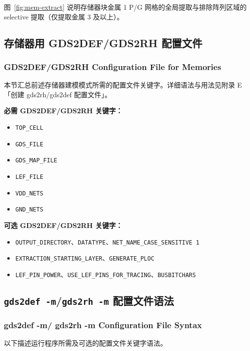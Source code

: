 \begin{itemize}
  图~\ref{fig:mem-extract} 说明存储器块金属 1 P/G 网格的全局提取与排除阵列区域的 selective 提取（仅提取金属 3 及以上）。
\end{itemize}


\subsection{存储器用 GDS2DEF/GDS2RH 配置文件}
\subsubsection*{GDS2DEF/GDS2RH Configuration File for Memories}

本节汇总前述存储器建模模式所需的配置文件关键字。详细语法与用法见附录 E「创建 gds2rh/gds2def 配置文件」。

\textbf{必需 GDS2DEF/GDS2RH 关键字：}
\begin{itemize}
  \item \texttt{TOP\_CELL}
  \item \texttt{GDS\_FILE}
  \item \texttt{GDS\_MAP\_FILE}
  \item \texttt{LEF\_FILE}
  \item \texttt{VDD\_NETS}
  \item \texttt{GND\_NETS}
\end{itemize}

\textbf{可选 GDS2DEF/GDS2RH 关键字：}
\begin{itemize}
  \item \texttt{OUTPUT\_DIRECTORY}、\texttt{DATATYPE}、\texttt{NET\_NAME\_CASE\_SENSITIVE 1}
  \item \texttt{EXTRACTION\_STARTING\_LAYER}、\texttt{GENERATE\_PLOC}
  \item \texttt{LEF\_PIN\_POWER}、\texttt{USE\_LEF\_PINS\_FOR\_TRACING}、\texttt{BUSBITCHARS}
\end{itemize}

\subsection{\texttt{gds2def -m}/\texttt{gds2rh -m} 配置文件语法}
\subsubsection*{gds2def -m/ gds2rh -m Configuration File Syntax}

以下描述运行程序所需及可选的配置文件关键字语法。

